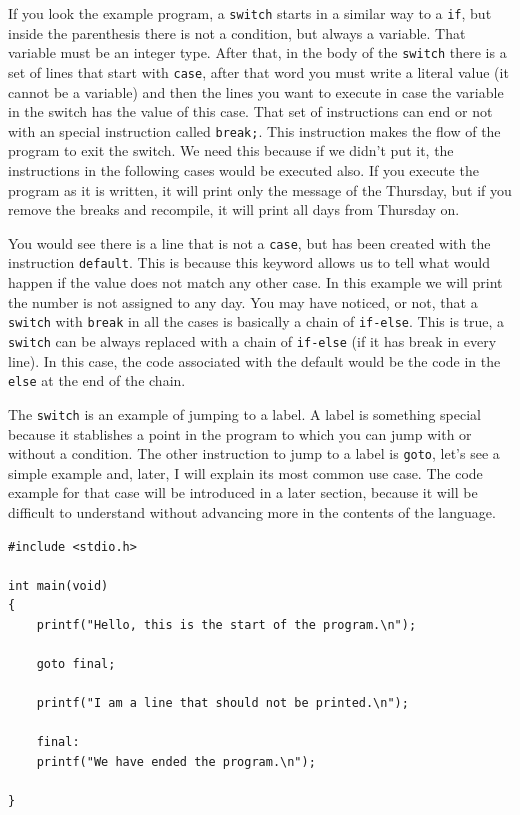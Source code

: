 \documentclass[a4paper]{article}
\begin{document}
If you look the example program, a \texttt{switch} starts in a similar way to
a \verb!if!, but inside the parenthesis there is not a condition, but always a
variable. That variable must be an integer type. After that, in the body
of the \texttt{switch} there is a set of lines that start with \verb!case!,
after that word you must write a literal value (it cannot be a variable) and
then the lines you want to execute in case the variable in the switch has
the value of this case. That set of instructions can end or not with an special
instruction called \lstinline[style=C]!break;!. This instruction makes the
flow of the program to exit the switch. We need this because if we didn't put
it, the instructions in the following cases would be executed also. If you
execute the program as it is written, it will print
only the message of the Thursday, but if you remove the breaks and
recompile, it will print all days from Thursday on.

You would see there is a line that is not a \texttt{case}, but has been created
with the instruction \texttt{default}. This is because this keyword allows us
to tell what would happen if the value does not match any other case. In this
example we will print the number is not assigned to any day. You may have
noticed, or not, that a \texttt{switch} with \texttt{break} in all the cases
is basically a chain of \texttt{if-else}. This is true, a \texttt{switch} can be
always replaced with a chain of \texttt{if-else} (if it has break in every
line). In this case, the code associated with the default would be the code
in the \texttt{else} at the end of the chain.

The \texttt{switch} is an example of jumping to a label. A label is something
special because it stablishes a point in the program to which you can jump with
or without a condition. The other instruction to jump to a label is
\texttt{goto}, let's see a simple example and, later, I will explain its most
common use case. The code example for that case will be introduced in a
later section, because it will be difficult to understand without advancing more
in the contents of the language.

\noindent
\begin{minipage}[H]{\linewidth}
\mbox{}
\begin{lstlisting}[style=C,
caption={Example of a program with \texttt{goto}},
label={lst:gotoExample}]
#include <stdio.h>

int main(void)
{
    printf("Hello, this is the start of the program.\n");

    goto final;

    printf("I am a line that should not be printed.\n");

    final:
    printf("We have ended the program.\n");

}
\end{lstlisting}
\end{minipage}
\end{document}
